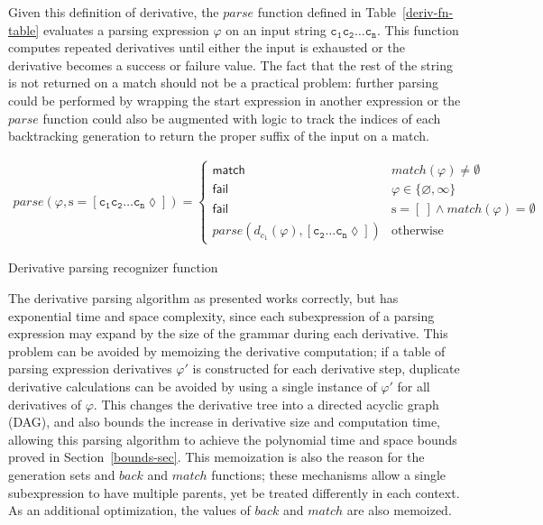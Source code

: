 \documentclass[submission,copyright,creativecommons]{eptcs}
\newcommand{\match}{\mathsf{match}}
\newcommand{\fail}{\mathsf{fail}}
\newcommand{\str}{\mathrm{s}}
\newcommand{\chs}[1]{\mathtt{#1}}
\newcommand{\eos}{\lozenge}
\begin{document}
Given this definition of derivative, the $parse$ function defined in Table~\ref{deriv-fn-table} evaluates a parsing expression $\varphi$ on an input string $\chs{c_1 c_2 \ldots c_n}$. 
This function computes repeated derivatives until either the input is exhausted or the derivative becomes a success or failure value. 
The fact that the rest of the string is not returned on a match should not be a practical problem: further parsing could be performed by wrapping the start expression in another expression or the $parse$ function could also be augmented with logic to track the indices of each backtracking generation to return the proper suffix of the input on a match.

\begin{table}
\centering
\begin{align*}
parse(\varphi,\str = [\chs{c_1 c_2 \ldots c_n} \eos]) = \begin{cases} 
    \match                                                  & match(\varphi) \neq \emptyset \\
    \fail                                                   & \varphi \in \{\varnothing, \infty\} \\
    \fail                                                   & \str = [~] \land match(\varphi) = \emptyset \\
    parse(d_{c_1}(\varphi), [\chs{c_2 \ldots c_n} \eos]) & \text{otherwise}
\end{cases}
\end{align*}
\caption{Derivative parsing recognizer function}
\label{deriv-fn-table}
\end{table}

The derivative parsing algorithm as presented works correctly, but has exponential time and space complexity, since each subexpression of a parsing expression may expand by the size of the grammar during each derivative. 
This problem can be avoided by memoizing the derivative computation; if a table of parsing expression derivatives $\varphi'$ is constructed for each derivative step, duplicate derivative calculations can be avoided by using a single instance of $\varphi'$ for all derivatives of $\varphi$.
This changes the derivative tree into a directed acyclic graph (DAG), and also bounds the increase in derivative size and computation time, allowing this parsing algorithm to achieve the polynomial time and space bounds proved in Section~\ref{bounds-sec}. 
This memoization is also the reason for the generation sets and $back$ and $match$ functions; these mechanisms allow a single subexpression to have multiple parents, yet be treated differently in each context. 
As an additional optimization, the values of $back$ and $match$ are also memoized.
\end{document}
